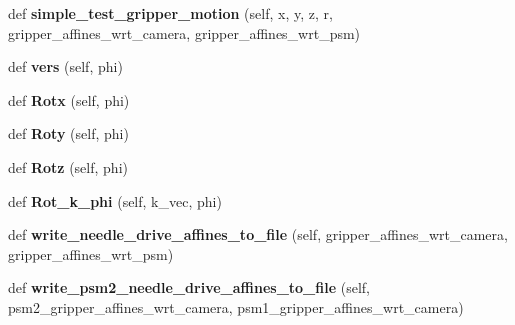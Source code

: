 \begin{DoxyCompactItemize}
\item 
def {\bfseries simple\+\_\+test\+\_\+gripper\+\_\+motion} (self, x, y, z, r, gripper\+\_\+affines\+\_\+wrt\+\_\+camera, gripper\+\_\+affines\+\_\+wrt\+\_\+psm)\hypertarget{classneedle__planner_1_1needle__planner_a137bb105b3aff32ee2f5aa492603c4b0}{}\label{classneedle__planner_1_1needle__planner_a137bb105b3aff32ee2f5aa492603c4b0}

\item 
def {\bfseries vers} (self, phi)\hypertarget{classneedle__planner_1_1needle__planner_ab140c3559aa4de813f04dbbb27bb2bd3}{}\label{classneedle__planner_1_1needle__planner_ab140c3559aa4de813f04dbbb27bb2bd3}

\item 
def {\bfseries Rotx} (self, phi)\hypertarget{classneedle__planner_1_1needle__planner_a028050607a7e404a8f9d594de3e1ec81}{}\label{classneedle__planner_1_1needle__planner_a028050607a7e404a8f9d594de3e1ec81}

\item 
def {\bfseries Roty} (self, phi)\hypertarget{classneedle__planner_1_1needle__planner_a8463e732157bb35e0a6be282328892c5}{}\label{classneedle__planner_1_1needle__planner_a8463e732157bb35e0a6be282328892c5}

\item 
def {\bfseries Rotz} (self, phi)\hypertarget{classneedle__planner_1_1needle__planner_ad4d767227136747c473080e27588ca67}{}\label{classneedle__planner_1_1needle__planner_ad4d767227136747c473080e27588ca67}

\item 
def {\bfseries Rot\+\_\+k\+\_\+phi} (self, k\+\_\+vec, phi)\hypertarget{classneedle__planner_1_1needle__planner_a45b33ff732b733c2afecbaacc514c904}{}\label{classneedle__planner_1_1needle__planner_a45b33ff732b733c2afecbaacc514c904}

\item 
def {\bfseries write\+\_\+needle\+\_\+drive\+\_\+affines\+\_\+to\+\_\+file} (self, gripper\+\_\+affines\+\_\+wrt\+\_\+camera, gripper\+\_\+affines\+\_\+wrt\+\_\+psm)\hypertarget{classneedle__planner_1_1needle__planner_a1716be4b1ed5ce05639b6c06a947bbf6}{}\label{classneedle__planner_1_1needle__planner_a1716be4b1ed5ce05639b6c06a947bbf6}

\item 
def {\bfseries write\+\_\+psm2\+\_\+needle\+\_\+drive\+\_\+affines\+\_\+to\+\_\+file} (self, psm2\+\_\+gripper\+\_\+affines\+\_\+wrt\+\_\+camera, psm1\+\_\+gripper\+\_\+affines\+\_\+wrt\+\_\+camera)\hypertarget{classneedle__planner_1_1needle__planner_a34f6081912095feb49c15712e25a1fcd}{}\label{classneedle__planner_1_1needle__planner_a34f6081912095feb49c15712e25a1fcd}

\end{DoxyCompactItemize}
